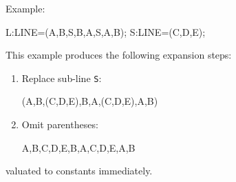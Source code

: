 Example:
\begin{example}
L:LINE=(A,B,S,B,A,S,A,B);
S:LINE=(C,D,E);
\end{example}
This example produces the following expansion steps:
\begin{enumerate}
\item Replace sub-line \texttt{S}:
\begin{example}
(A,B,(C,D,E),B,A,(C,D,E),A,B)
\end{example}
\item Omit parentheses:
\begin{example}
A,B,C,D,E,B,A,C,D,E,A,B
\end{example}
\end{enumerate}

valuated to constants immediately.

